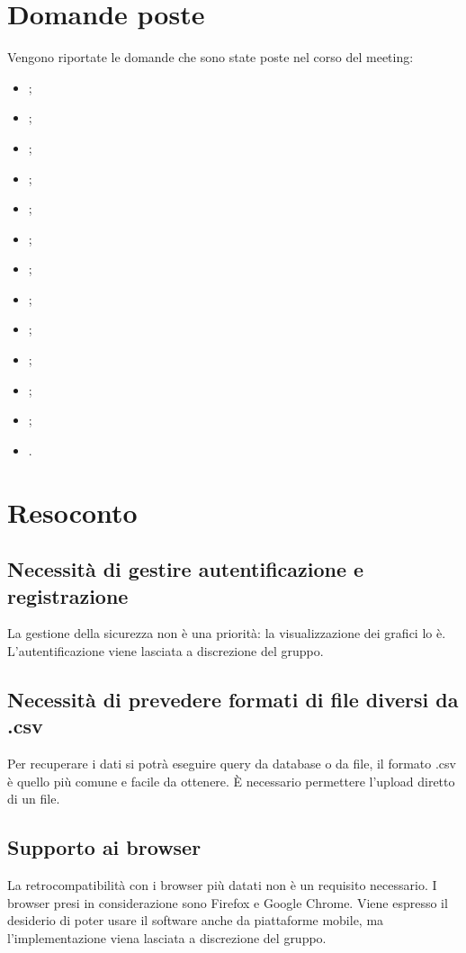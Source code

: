 \documentclass{article}
\begin{document}
\section{Domande poste}
\label{sec:domande_poste}
	Vengono riportate le domande che sono state poste nel corso del meeting:
	\begin{itemize}
		\item {};
		\item {};
		\item {};
		\item {};
		\item {};
		\item {};
		\item {};
		\item {};
		\item {};
		\item {};
		\item {};
		\item {};
        \item {}.
    	\end{itemize}

\section{Resoconto}
\label{sec:resoconto}

	\subsection{Necessità di gestire autentificazione e registrazione}
	\label{sub:domanda_01}
    La gestione della sicurezza non è una priorità: la visualizzazione dei grafici lo è. L'autentificazione viene lasciata a discrezione del gruppo.
    
    \subsection{Necessità di prevedere formati di file diversi da .csv}
	\label{sub:domanda_02}
	Per recuperare i dati si potrà eseguire query da database o da file, il formato .csv è quello più comune e facile da ottenere. È necessario permettere l'upload diretto di un file.
	
    \subsection{Supporto ai browser}
    \label{sub:domanda_03}
    La retrocompatibilità con i browser più datati non è un requisito necessario. I browser presi in considerazione sono Firefox e Google Chrome. Viene espresso il desiderio di poter usare il software anche da piattaforme mobile, ma l'implementazione viena lasciata a discrezione del gruppo.
\end{document}
